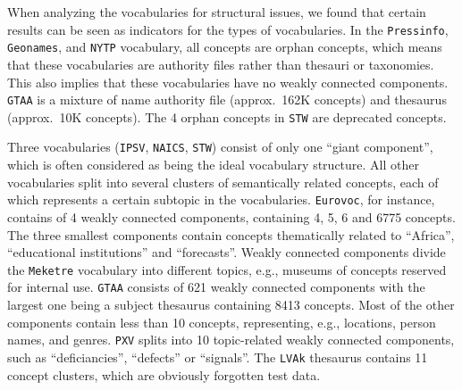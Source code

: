 When analyzing the vocabularies for structural issues, we found that certain results can be seen as indicators for the types of vocabularies.
In the \texttt{Pressinfo}, \texttt{Geonames}, and \texttt{NYTP} vocabulary, all concepts are orphan concepts, which means that these vocabularies are authority files rather than thesauri or taxonomies. This also implies that these vocabularies have no weakly connected components. \texttt{GTAA} is a mixture of name authority file (approx.~162K concepts) and thesaurus (approx.~10K concepts). The 4 orphan concepts in \texttt{STW} are deprecated concepts.


Three vocabularies (\texttt{IPSV}, \texttt{NAICS}, \texttt{STW}) consist of only one ``giant component'', which is often considered as being the ideal vocabulary structure. All other vocabularies split into several clusters of semantically related concepts, each of which represents a certain subtopic in the vocabularies. \texttt{Eurovoc}, for instance, contains of 4 weakly connected components, containing 4, 5, 6 and 6775 concepts. The three smallest components contain concepts thematically related to ``Africa'', ``educational institutions'' and ``forecasts''. Weakly connected components divide the \texttt{Meketre} vocabulary into different topics, e.g., museums of concepts reserved for internal use. \texttt{GTAA} consists of 621 weakly connected components with the largest one being a subject thesaurus containing 8413 concepts. Most of the other components contain less than 10 concepts, representing, e.g., locations, person names, and genres. \texttt{PXV} splits into 10 topic-related weakly connected components, such as ``deficiancies'', ``defects'' or ``signals''. The \texttt{LVAk} thesaurus contains 11 concept clusters, which are obviously forgotten test data.


